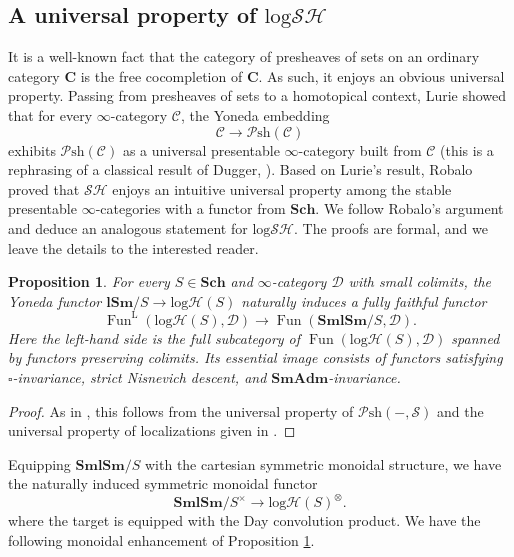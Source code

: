 \documentclass[11pt, a4paper]{amsart}
\newtheorem{prop}[thm]{Proposition}
\theoremstyle{definition}
\numberwithin{equation}{subsection}
\newcommand{\Sch}{\mathbf{Sch}}
\newcommand{\lSm}{\mathbf{lSm}}
\newcommand{\SmlSm}{\mathbf{SmlSm}}
\newcommand{\SmAdm}{\mathbf{SmAdm}}
\newcommand{\bC}{\mathbf{C}}
\newcommand{\boxx}{\square}
\newcommand{\infSpc}{\mathcal{S}}
\newcommand{\infPsh}{\mathcal{P}\mathrm{sh}}
\newcommand{\Fun}{\operatorname{Fun}}
\newcommand{\infC}{\mathcal{C}}
\newcommand{\infD}{\mathcal{D}}
\newcommand{\infSH}{\mathcal{SH}}
\newcommand{\inflogH}{\mathrm{log}\mathcal{H}}
\newcommand{\inflogSH}{\mathrm{log}\mathcal{SH}}
\begin{document}
\subsection{A universal property of \texorpdfstring{$\inflogSH$}{logSH}}
\label{subsection:universal}
It is a well-known fact that the category of presheaves of sets on an ordinary category $\bC$ is the free cocompletion of $\bC$. As such, it enjoys an obvious universal property. Passing from presheaves of sets to a homotopical context,
Lurie showed that for every $\infty$-category $\infC$,
the Yoneda embedding
\[
\infC\to \infPsh(\infC)
\]
exhibits $\infPsh(\infC)$
as a universal presentable $\infty$-category 
built from $\infC$ (this is a rephrasing of a classical result of Dugger,  \cite[Proposition 2.1]{Dugger}).
Based on Lurie's result, 
Robalo \cite[Corollary 2.39]{RobaloThesispublished} proved that $\infSH$ enjoys an intuitive universal property among the stable presentable $\infty$-categories with a functor from $\Sch$.
We follow Robalo's argument and deduce an analogous statement for $\inflogSH$. The proofs are  formal, and we leave the details to the interested reader.


\begin{prop}
\label{univlogSH.1}
For every $S\in \Sch$ and $\infty$-category $\infD$ with small colimits, 
the Yoneda functor $\lSm/S\to \inflogH(S)$ naturally induces a fully faithful functor
\[
\Fun^{\mathrm{L}}(\inflogH(S),\infD)
\to
\Fun(\SmlSm/S,\infD).
\]
Here the left-hand side is the full subcategory of
$\Fun(\inflogH(S),\infD)$ spanned by functors preserving colimits.
Its essential image consists of functors satisfying $\boxx$-invariance, strict Nisnevich descent, and $\SmAdm$-invariance. 
\end{prop}
\begin{proof}
As in \cite[Theorem 2.30]{RobaloThesispublished}, 
this follows from the universal property of $\infPsh(-,\infSpc)$ 
and the universal property of localizations given in \cite[Proposition 5.5.4.20]{HTT}.
\end{proof}

Equipping $\SmlSm/S$ with the cartesian symmetric monoidal structure,
we have the naturally induced symmetric monoidal functor
\begin{equation}
\label{univlogSH.4.1}
\SmlSm/S^\times
\to
\inflogH(S)^\otimes.
\end{equation}
where the target is equipped with the Day convolution product. We have the following monoidal enhancement of Proposition \ref{univlogSH.1}.
\end{document}
